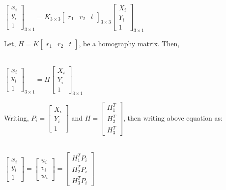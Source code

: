 \documentclass[a4paper]{article}
\begin{document}
\begin{center}
\\$ \begin{bmatrix} x_{i}\\ y_{i}\\ 1 \end{bmatrix}_{3\times1}   =   K_{3\times3} \begin{bmatrix} r_{1} & r_{2} & t \end{bmatrix}_{3\times3} \begin{bmatrix} X_{i}\\ Y_{i} \\ 1  \end{bmatrix}_{3\times1}$
\end{center}

Let, $H = K \begin{bmatrix} r_{1} & r_{2} & t \end{bmatrix}$, be a homography matrix. Then, 

\begin{center}
\\$ \begin{bmatrix} x_{i}\\ y_{i}\\ 1 \end{bmatrix}_{3\times1}   =   H \begin{bmatrix} X_{i}\\ Y_{i} \\ 1  \end{bmatrix}_{3\times1}$
\end{center}

Writing, $P_{i} = \begin{bmatrix} X_{i}\\ Y_{i} \\ 1 \end{bmatrix}$ and $H = \begin{bmatrix} H_{1}^T \\ H_{2}^T \\ H_{3}^T \end{bmatrix}$, then writing above equation as:  

\begin{center}
\\$ \begin{bmatrix} x_{i}\\ y_{i}\\ 1 \end{bmatrix}   = \begin{bmatrix} u_{i}\\ v_{i}\\ w_{i} \end{bmatrix}  = \begin{bmatrix} H_{1}^T P_{i}  \\ H_{2}^T P_{i} \\ H_{3}^T P_{i} \end{bmatrix}$
\end{center}
\end{document}
